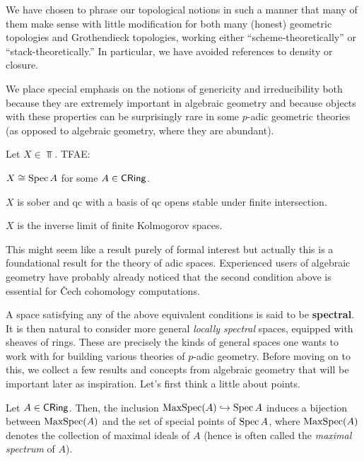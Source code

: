 \documentclass[11pt]{article}
\begin{document}
\begin{remark}
We have chosen to phrase our topological notions in such a manner that many of them make sense with little modification for both many (honest) geometric topologies and Grothendieck topologies, working either ``scheme-theoretically'' or ``stack-theoretically.'' In particular, we have avoided references to density or closure.
\end{remark}

\begin{remark}
We place special emphasis on the notions of genericity and irreducibility both because they are extremely important in algebraic geometry and because objects with these properties can be surprisingly rare in some $p$-adic geometric theories (as opposed to algebraic geometry, where they are abundant).
\end{remark}

\begin{theorem}[Hochster]
Let $X\in\Top$. TFAE:
\begin{enum}{\roman}
\item $X\cong\operatorname{Spec} A$ for some $A\in\operatorname{\mathsf{CRing}}$.

\item $X$ is sober and qc with a basis of qc opens stable under finite intersection.

\item $X$ is the inverse limit of finite Kolmogorov spaces.
\end{enum}
\end{theorem}

\begin{remark}
This might seem like a result purely of formal interest but actually this is a foundational result for the theory of adic spaces. Experienced users of algebraic geometry have probably already noticed that the second condition above is essential for \v{C}ech cohomology computations.
\end{remark}

A space satisfying any of the above equivalent conditions is said to be \textbf{spectral}. It is then natural to consider more general \emph{locally spectral} spaces, equipped with sheaves of rings. These are precisely the kinds of general spaces one wants to work with for building various theories of $p$-adic geometry. Before moving on to this, we collect a few results and concepts from algebraic geometry that will be important later as inspiration. Let's first think a little about points.

\begin{proposition}
Let $A\in\operatorname{\mathsf{CRing}}$. Then, the inclusion $\operatorname{MaxSpec}(A)\hookrightarrow\operatorname{Spec} A$ induces a bijection between $\operatorname{MaxSpec}(A)$ and the set of special points of $\operatorname{Spec} A$, where $\operatorname{MaxSpec}(A)$ denotes the collection of maximal ideals of $A$ (hence is often called the \emph{maximal spectrum} of $A$). 
\end{proposition}
\end{document}

